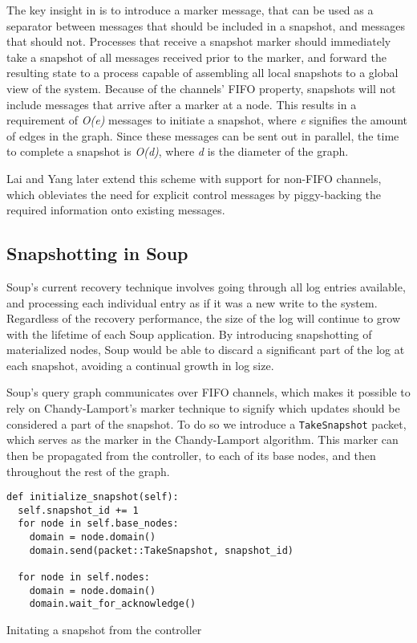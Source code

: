 \documentclass[b5paper]{report}
\begin{document}
The key insight in \cite{chandy-lamport} is to introduce a marker message, that
can be used as a separator between messages that should be included in a
snapshot, and messages that should not. Processes that receive a snapshot marker
should immediately take a snapshot of all messages received prior to the marker,
and forward the resulting state to a process capable of assembling all local
snapshots to a global view of the system. Because of the channels' FIFO
property, snapshots will not include messages that arrive after a marker at a
node. This results in a requirement of \textit{O(e)} messages to initiate a
snapshot, where \textit{e} signifies the amount of edges in the graph. Since
these messages can be sent out in parallel, the time to complete a snapshot is
\textit{O(d)}, where \textit{d} is the diameter of the graph.

Lai and Yang \cite{lai-yang} later extend this scheme with support for non-FIFO
channels, which obleviates the need for explicit control messages by piggy-backing
the required information onto existing messages.

\subsection{Snapshotting in Soup}
Soup's current recovery technique involves going through all log entries
available, and processing each individual entry as if it was a new write to the
system. Regardless of the recovery performance, the size of the log will
continue to grow with the lifetime of each Soup application. By introducing
snapshotting of materialized nodes, Soup would be able to discard a significant
part of the log at each snapshot, avoiding a continual growth in log size.

Soup's query graph communicates over FIFO channels, which makes it possible to
rely on Chandy-Lamport's marker technique to signify which updates should be
considered a part of the snapshot. To do so we introduce a \texttt{TakeSnapshot}
packet, which serves as the marker in the Chandy-Lamport algorithm. This marker
can then be propagated from the controller, to each of its base nodes, and then
throughout the rest of the graph.

\begin{listing}[H]
  \begin{verbatim}
def initialize_snapshot(self):
  self.snapshot_id += 1
  for node in self.base_nodes:
    domain = node.domain()
    domain.send(packet::TakeSnapshot, snapshot_id)

  for node in self.nodes:
    domain = node.domain()
    domain.wait_for_acknowledge()
  \end{verbatim}

  \caption{Initating a snapshot from the controller}
\end{listing}
\end{document}
